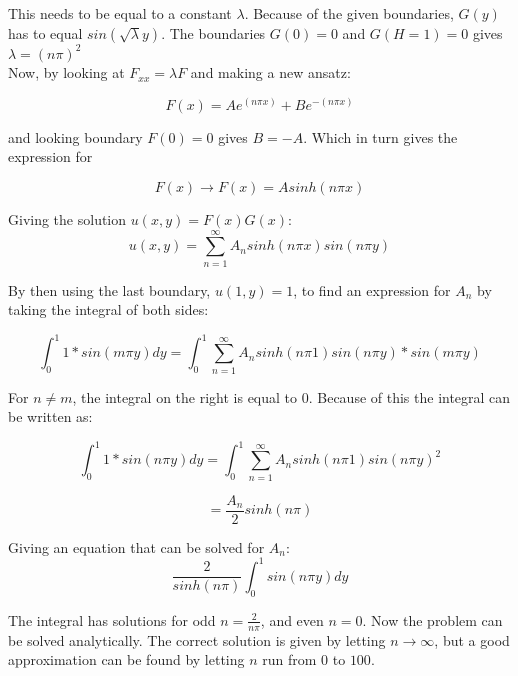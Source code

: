 \documentclass[10pt,a4paper]{article}
\begin{document}
\noindent This needs to be equal to a constant $\lambda$. Because of the given boundaries, $G(y)$ has to equal $sin(\sqrt{\lambda}y)$. The boundaries $G(0)=0$ and $G(H=1)=0$ gives $\lambda=(n\pi)^2$\\

\noindent Now, by looking at $F_{xx}=\lambda F$ and making a new ansatz: 

\begin{equation}
F(x)=Ae^{(n\pi x)}+Be^{-(n\pi x)}
\end{equation}

\noindent and looking boundary $F(0)=0$ gives $B=-A$. Which in turn gives the expression for 

\begin{equation}
F(x) \rightarrow F(x)=Asinh(n\pi x)
\end{equation}

\noindent Giving the solution $u(x,y)=F(x)G(x)$:\\

\begin{equation}
u(x,y)=\sum^\infty_{n=1}A_nsinh(n\pi x)sin(n\pi y)
\end{equation}

\noindent By then using the last boundary, $u(1,y)=1$, to find an expression for $A_n$ by taking the integral of both sides: 


\begin{equation}
\int_0^1 1*sin(m\pi y) dy = \int_0^1 \sum^\infty_{n=1}A_nsinh(n\pi 1)sin(n\pi y)*sin(m\pi y)
\end{equation}

\noindent For $n\neq m$, the integral on the right is equal to 0. Because of this the integral can be written as:


\begin{equation}
\int_0^1 1*sin(n\pi y) dy = \int_0^1 \sum^\infty_{n=1}A_nsinh(n\pi 1)sin(n\pi y)^2
\end{equation}

\begin{equation}
= \frac{A_n}{2}sinh(n\pi) 
\end{equation}

\noindent Giving an equation that can be solved for $A_n$:\\

\begin{equation}
\frac{2}{sinh(n\pi)}\int_0^1sin(n\pi y) dy
\end{equation}

\noindent The integral has solutions for odd $n = \frac{2}{n\pi}$, and even $n = 0$. Now the problem can be solved analytically. The correct solution is given by letting $n \rightarrow \infty$, but a good approximation can be found by letting $n$ run from $0$ to $100$. 
\end{document}
